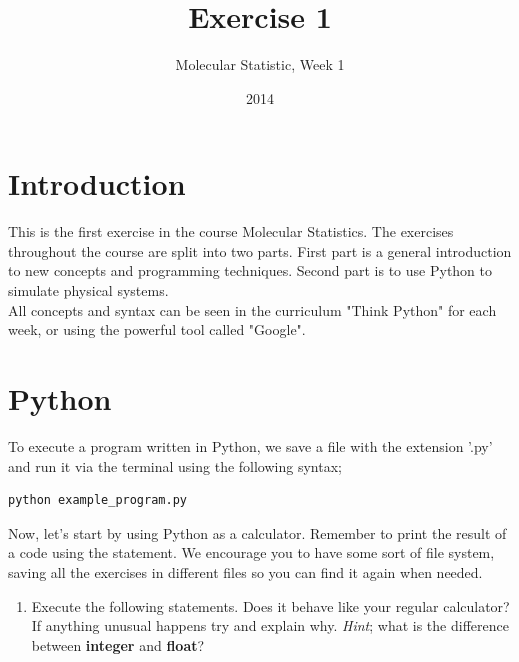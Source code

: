 \documentclass{article}
\title{Exercise 1}
\author{Molecular Statistic, Week 1}
\date{2014}
\begin{document}

\maketitle

\section{Introduction}

This is the first exercise in the course Molecular Statistics. The exercises
throughout the course are split into two parts. First part is a general
introduction to new concepts and programming techniques. Second part is to use
Python to simulate physical systems.\\

All concepts and syntax can be seen in the curriculum "Think Python" for each
week, or using the powerful tool called "Google".

\section{Python}

To execute a program written in Python, we save a file with the extension
'.py' and run it via the terminal using the following syntax;

\begin{lstlisting}
python example_program.py
\end{lstlisting}

Now, let's start by using Python as a calculator.
Remember to print the result of a code using the  statement.
We encourage you to have some sort of file system, saving all the exercises in
different files so you can find it again when needed.

\begin{enumerate}
  \item Execute the following statements. Does it behave like your regular
    calculator? If anything unusual happens try and explain why.
    {\em Hint}; what is the difference between {\bf integer} and {\bf float}?

    \begin{centering}
    \end{centering}
\end{enumerate}
\end{document}
